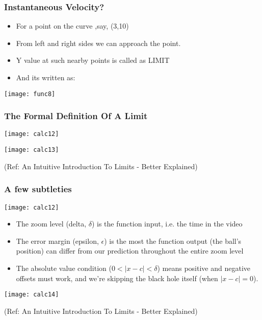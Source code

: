  \begin{frame}[fragile]\frametitle{Instantaneous Velocity?}
\begin{itemize}
\item For a point on the curve ,say, (3,10)
\item From left and right sides we can approach the point.
\item Y value at such nearby points is called as LIMIT
\item And its written as:
\end{itemize}
\begin{center}
\texttt{[image: func8]}
\end{center}
\end{frame}


 \begin{frame}[fragile]\frametitle{The Formal Definition Of A Limit}


\begin{center}
\texttt{[image: calc12]}

\texttt{[image: calc13]}

\end{center}


\tiny{(Ref: An Intuitive Introduction To Limits - Better Explained)}
\end{frame}

 \begin{frame}[fragile]\frametitle{A few subtleties }

\begin{center}
\texttt{[image: calc12]}
\end{center}


\begin{itemize}
\item The zoom level (delta, $\delta$) is the function input, i.e. the time in the video
\item The error margin (epsilon, $\epsilon$) is the most the function output (the ball’s position) can differ from our prediction throughout the entire zoom level
\item The absolute value condition ($0 < |x - c| < \delta$) means positive and negative offsets must work, and we’re skipping the black hole itself (when $|x - c| = 0$).
\end{itemize}


\begin{center}
\texttt{[image: calc14]}
\end{center}


\tiny{(Ref: An Intuitive Introduction To Limits - Better Explained)}
\end{frame}




